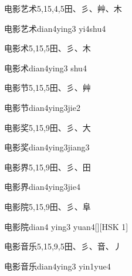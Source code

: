 \begin{entry}{电影艺术}{5,15,4,5}{⽥、⼺、⾋、⽊}
  \begin{phonetics}{电影艺术}{dian4ying3 yi4shu4}
  \end{phonetics}
\end{entry}

\begin{entry}{电影术}{5,15,5}{⽥、⼺、⽊}
  \begin{phonetics}{电影术}{dian4ying3 shu4}
  \end{phonetics}
\end{entry}

\begin{entry}{电影节}{5,15,5}{⽥、⼺、⾋}
  \begin{phonetics}{电影节}{dian4ying3jie2}
  \end{phonetics}
\end{entry}

\begin{entry}{电影奖}{5,15,9}{⽥、⼺、⼤}
  \begin{phonetics}{电影奖}{dian4ying3jiang3}
  \end{phonetics}
\end{entry}

\begin{entry}{电影界}{5,15,9}{⽥、⼺、⽥}
  \begin{phonetics}{电影界}{dian4ying3jie4}
  \end{phonetics}
\end{entry}

\begin{entry}{电影院}{5,15,9}{⽥、⼺、⾩}
  \begin{phonetics}{电影院}{dian4 ying3 yuan4}[][HSK 1]
  \end{phonetics}
\end{entry}

\begin{entry}{电影音乐}{5,15,9,5}{⽥、⼺、⾳、⼃}
  \begin{phonetics}{电影音乐}{dian4ying3 yin1yue4}
  \end{phonetics}
\end{entry}

